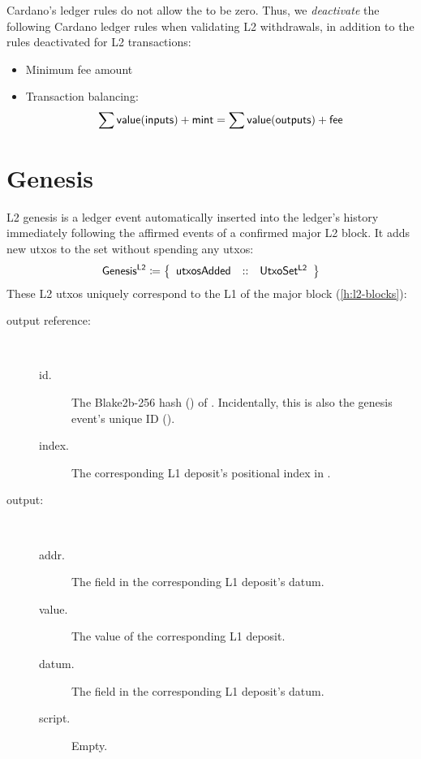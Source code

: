 \documentclass[../hydrozoa.tex]{subfiles}
\begin{document}
Cardano's ledger rules do not allow the  to be zero. Thus, we \emph{deactivate} the following Cardano ledger rules when validating L2 withdrawals, in addition to the rules deactivated for L2 transactions:
\begin{itemize}
  \item Minimum fee amount
  \item Transaction balancing:
    \begin{equation*}
      \sum \mathsf{value} (\mathsf{inputs}) + \mathsf{mint} =
      \sum \mathsf{value} (\mathsf{outputs}) + \mathsf{fee}
    \end{equation*}
\end{itemize}

\section{Genesis}%
\label{h:ledger-genesis}%

L2 genesis is a ledger event automatically inserted into the ledger's history immediately following the affirmed events of a confirmed major L2 block.
It adds new utxos to the  set without spending any utxos:
\begin{equation*}
  \mathsf{Genesis^{L2}} \coloneq \left\{
  \begin{array}{lll}
    \mathsf{utxosAdded} &::& \mathsf{UtxoSet^{L2}}
  \end{array}\right\}
\end{equation*}
These L2 utxos uniquely correspond to the L1  of the major block (\cref{h:l2-blocks}):
\begin{description}
  \item[output reference:]~
    \begin{description}
      \item[id.] The Blake2b-256 hash () of .
      Incidentally, this is also the genesis event's unique ID ().
      \item[index.] The corresponding L1 deposit's positional index in .
    \end{description}
  \item[output:]~
    \begin{description}
      \item[addr.] The  field in the corresponding L1 deposit's datum.
      \item[value.] The value of the corresponding L1 deposit.
      \item[datum.] The  field in the corresponding L1 deposit's datum.
      \item[script.] Empty.
    \end{description}
  \end{description}
\end{document}
